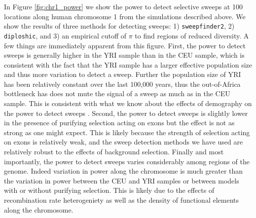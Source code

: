 \documentclass[hidelinks]{article}
\newcommand{\sweepfinder}{\texttt{sweepfinder2}\xspace}
\newcommand{\diploshic}{\texttt{diploshic}\xspace}
\begin{document}
    In Figure \ref{fig:chr1_power} we show the power to detect selective sweeps at 100 locations along human chromosome 1 from
    the simulations described above. We show the results of three methods for detecting sweeps: 1) \sweepfinder \citep{degiorgio2016sweepfinder2},
    2) \diploshic \citep{kern2018diplos}, and 3) an empirical cutoff of $\pi$ to find regions of reduced diversity.
    A few things are immediately apparent from this figure. First, the power to detect sweeps is generally higher in the YRI sample
    than in the CEU sample, which is consistent with the fact that the YRI sample has a larger effective population size and thus
    more variation to detect a sweep. Further the population size of YRI has been relatively constant over the last 100,000 years,
    thus the out-of-Africa bottleneck has does not mute the signal of a sweep as much as in the CEU sample. This is consistent with
    what we know about the effects of demography on the power to detect sweeps \citep[e.g.,][]{simonsen1995properties}.
    Second, the power to detect sweeps is slightly lower in the presence of purifying selection acting on exons but the effect is not
    as strong as one might expect. This is likely because the strength of selection acting on exons is relatively weak, and the
    sweep detection methods we have used are relatively robust to the effects of background selection. 
    Finally and most importantly, the power to detect sweeps varies considerably among regions of the genome. 
    Indeed variation in power along the chromosome is much greater than the variation in power between the CEU and YRI samples or between
    models with or without purifying selection. This is likely due to the effects of recombination rate heterogeniety as well
    as the density of functional elements along the chromosome.
\end{document}
